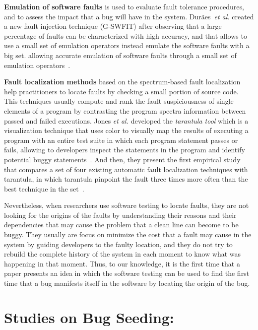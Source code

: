 \documentclass[a4paper, 12pt]{book}
\begin{document}
\textbf{Emulation of software faults} is used to evaluate fault tolerance procedures, and to assess the impact that a bug will have in the system. Dur\~aes~\emph{et al.} created a new fault injection technique (G-SWFIT) after observing that a large percentage of faults can be characterized with high accuracy, and that allows to use a small set of emulation operators instead emulate the software faults with a big set. allowing accurate emulation of software faults through a small set of emulation operators~\cite{duraes2006emulation}.


\textbf{Fault localization methods} based on the spectrum-based fault localization~\cite{abreu2009practical,jones2002visualization,jones2005empirical,liu2006statistical} help practitioners to locate faults by checking a small portion of source code. This techniques usually compute and rank the fault suspiciousness of single elements of a program by contrasting the program spectra information between passed and failed executions. Jones \emph{et al.} developed the \emph{tarantula tool} which is a visualization technique that uses color to visually map the results of executing a program with an entire test suite in which each program statement passes or fails, allowing to developers inspect the statements in the program and identify potential buggy statements~\cite{jones2002visualization}. And then, they present the first empirical study that compares a set of four existing automatic fault localization techniques with tarantula, in which tarantula pinpoint the fault three times more often than the best technique in the set~\cite{jones2005empirical}.


Nevertheless, when researchers use software testing to locate faults, they are not looking for the origins of the faults by understanding their reasons and their dependencies that may cause the problem that a clean line can become to be buggy. They usually are focus on minimize the cost that a fault may cause in the system by guiding developers to the faulty location, and they do not try to rebuild the complete history of the system in each moment to know what was happening in that moment. Thus, to our knowledge, it is the first time that a paper presents an idea in which the software testing can be used to find the first time that a bug manifests itself in the software by locating the origin of the bug.


\section{Studies on Bug Seeding:}
\label{subsec:SZZuse}
\end{document}
